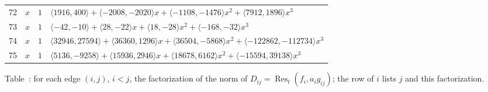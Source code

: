 \documentclass[11pt]{article}
\newcounter{dtab}
\begin{document}
{\begin{longtable}{@{}rcl>{\raggedright\arraybackslash}p{}@{}}
72 & $x$ & $1$ & $\langle 1916,400\rangle+\langle -2008,-2020\rangle x+\langle -1108,-1476\rangle x^{2}+\langle 7912,1896\rangle x^{3}$\\
73 & $x$ & $1$ & $\langle -42,-10\rangle+\langle 28,-22\rangle x+\langle 18,-28\rangle x^{2}+\langle -168,-32\rangle x^{3}$\\
74 & $x$ & $1$ & $\langle 32946,27594\rangle+\langle 36360,1296\rangle x+\langle 36504,-5868\rangle x^{2}+\langle -122862,-112734\rangle x^{3}$\\
75 & $x$ & $1$ & $\langle 5136,-9258\rangle+\langle 15936,2946\rangle x+\langle 18678,6162\rangle x^{2}+\langle -15594,39138\rangle x^{3}$\\
\end{longtable}
}

\begin{center}
\label{tab:res3}
Table~\thedtab: for each edge $(i,j)$, $i<j$, the factorization of the norm of $D_{ij}=\operatorname{Res}_t(f_i,a_ig_{ij})$; the row of $i$ lists $j$ and this factorization.
\end{center}
\end{document}
